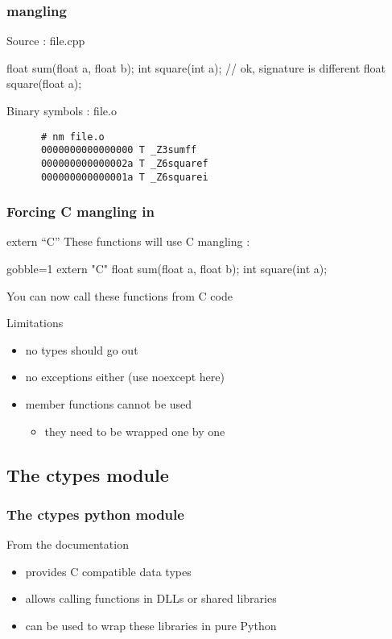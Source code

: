 \begin{frame}[fragile]
  \frametitle{\cpp mangling}
  \begin{exampleblock}{Source : file.cpp}
    \begin{cppcode*}{}
      float sum(float a, float b);
      int square(int a);
      // ok, signature is different
      float square(float a);
    \end{cppcode*}
  \end{exampleblock}
  \begin{block}{Binary symbols : file.o}
    \begin{verbatim}
      # nm file.o
      0000000000000000 T _Z3sumff
      000000000000002a T _Z6squaref
      000000000000001a T _Z6squarei
    \end{verbatim}
  \end{block}
\end{frame}

\begin{frame}[fragile]
  \frametitle{Forcing C mangling in \cpp}
  \begin{block}{extern ``C''}
    These functions will use C mangling :
    \begin{cppcode*}{gobble=1}
      extern "C" {
        float sum(float a, float b);
        int square(int a);
      }
    \end{cppcode*}
  \end{block}
  \pause
  You can now call these \cpp functions from C code
  \pause
  \begin{alertblock}{Limitations}
    \begin{itemize}
    \item no \cpp types should go out
    \item no exceptions either (use noexcept here)
    \item member functions cannot be used
      \begin{itemize}
      \item they need to be wrapped one by one
      \end{itemize}
    \end{itemize}
  \end{alertblock}
\end{frame}

\subsection[ctypes]{The ctypes module}

\begin{frame}[fragile]
  \frametitle{The ctypes python module}
  \begin{block}{From the documentation}
    \begin{itemize}
    \item provides C compatible data types
    \item allows calling functions in DLLs or shared libraries
    \item can be used to wrap these libraries in pure Python
    \end{itemize}
  \end{block}
\end{frame}


